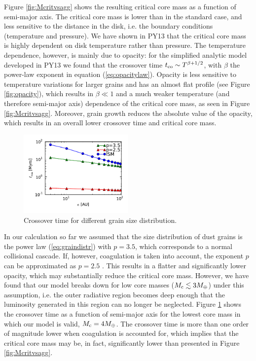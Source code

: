 \documentclass[apj]{emulateapj}
\begin{document}
Figure \ref{fig:Mcritvsagg} shows the resulting critical core mass as a function of semi-major axis. The critical core mass is lower than in the standard case, and less sensitive to the distance in the disk, i.e. the boundary conditions (temperature and pressure). We have shown in PY13 that the critical core mass is highly dependent on disk temperature rather than pressure. The temperature dependence, however, is mainly due to opacity: for the simplified analytic model developed in PY13 we found that the crossover time $t_{\rm co} \sim T^{\beta+1/2}$, with $\beta$ the power-law exponent in equation (\ref{eq:opacitylaw}). Opacity is less sensitive to temperature variations for larger grains and has an almost flat profile (see Figure \ref{fig:opacity}), which results in $\beta \ll 1$ and a much weaker temperature (and therefore semi-major axis) dependence of the critical core mass, as seen in Figure \ref{fig:Mcritvsagg}. Moreover, grain growth reduces the absolute value of the opacity, which results in an overall lower crossover time and critical core mass. 

\begin{figure}[h!]
\centering
\includegraphics[width=0.5\textwidth]{../../figs/ModelAtmospheres/RadSelfGravRealEOS/PaperFigs/tco_vs_a_Mc4_comp.pdf}
\caption{Crossover time for different grain size distribution.}
\label{fig:p25p35}
\end{figure}

In our calculation so far we assumed that the size distribution of dust grains is the power law (\ref{eq:graindistr}) with $p=3.5$, which corresponds to a normal collisional cascade. If, however, coagulation is taken into account, the exponent $p$ can be approximated as $p=2.5$ \citep{dalessio01}. This results in a flatter and significantly lower opacity, which may substantially reduce the critical core mass. However, we have found that our model breaks down for low core masses ($M_{\rm c} \lesssim 3 M_{\oplus}$) under this assumption, i.e. the outer radiative region becomes deep enough that the luminosity generated in this region can no longer be neglected. Figure \ref{fig:p25p35} shows the crossover time as a function of semi-major axis for the lowest core mass in which our model is valid, $M_{\rm c}=4 M_{\oplus}$. The crossover time is more than one order of magnitude lower when coagulation is accounted for, which implies that the critical core mass may be, in fact, significantly lower than presented in Figure \ref{fig:Mcritvsagg}. 
\end{document}
